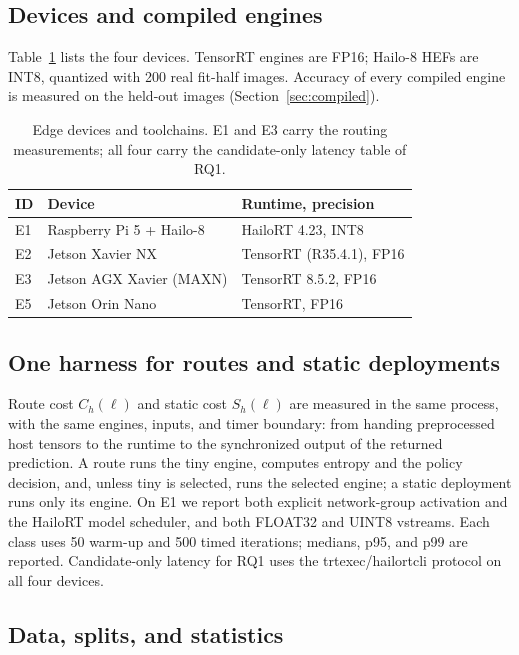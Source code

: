 \documentclass[a4paper,5p]{elsarticle}
\begin{document}
\subsection{Devices and compiled engines}

Table~\ref{tab:devices} lists the four devices. TensorRT engines are FP16; Hailo-8 HEFs are INT8, quantized with 200 real fit-half images. Accuracy of every compiled engine is measured on the held-out images (Section~\ref{sec:compiled}).

\begin{table}[t]
\centering
\caption{Edge devices and toolchains. E1 and E3 carry the routing measurements; all four carry the candidate-only latency table of RQ1.}
\label{tab:devices}
\small
\footnotesize
\begin{tabularx}{\linewidth}{@{}l>{\raggedright\arraybackslash}Xl@{}}
\toprule
ID & Device & Runtime, precision \\
\midrule
E1 & Raspberry Pi 5 + Hailo-8 & HailoRT 4.23, INT8 \\
E2 & Jetson Xavier NX & TensorRT (R35.4.1), FP16 \\
E3 & Jetson AGX Xavier (MAXN) & TensorRT 8.5.2, FP16 \\
E5 & Jetson Orin Nano & TensorRT, FP16 \\
\bottomrule
\end{tabularx}
\end{table}

\subsection{One harness for routes and static deployments}

Route cost $C_h(\ell)$ and static cost $S_h(\ell)$ are measured in the same process, with the same engines, inputs, and timer boundary: from handing preprocessed host tensors to the runtime to the synchronized output of the returned prediction. A route runs the tiny engine, computes entropy and the policy decision, and, unless tiny is selected, runs the selected engine; a static deployment runs only its engine. On E1 we report both explicit network-group activation and the HailoRT model scheduler, and both FLOAT32 and UINT8 vstreams. Each class uses 50 warm-up and 500 timed iterations; medians, p95, and p99 are reported. Candidate-only latency for RQ1 uses the trtexec/hailortcli protocol on all four devices.

\subsection{Data, splits, and statistics}
\end{document}

